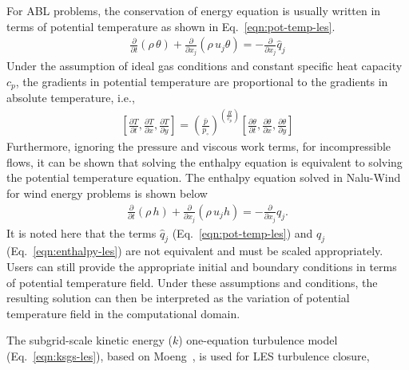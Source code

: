 For ABL problems, the conservation of energy equation is usually written in
terms of potential temperature as shown in Eq.~\ref{eqn:pot-temp-les}.
\begin{align}
  \frac{\partial}{\partial t} \left(\rho\, {\theta}\right) +
  \frac{\partial}{\partial x_j} \left(\rho\, {u}_j {\theta} \right) = - \frac{\partial}{\partial x_j} \hat{q}_j \label{eqn:pot-temp-les}
\end{align}
Under the assumption of ideal gas conditions and constant specific heat capacity
$c_p$, the gradients in potential temperature are proportional to the gradients
in absolute temperature, i.e.,
\begin{align}
   \left[ \frac{\partial T}{\partial t}, \frac{\partial T}{\partial x}, \frac{\partial T}{\partial y} \right] =
   \left( \frac{\bar{p}}{p_\circ} \right)^{\left(\frac{R}{c_p}\right)} \left[ \frac{\partial \theta}{\partial t}, \frac{\partial \theta}{\partial x}, \frac{\partial \theta}{\partial y} \right]
\end{align}
Furthermore, ignoring the pressure and viscous work terms, for incompressible
flows, it can be shown that solving the enthalpy equation is equivalent to
solving the potential temperature equation. The enthalpy equation solved in
Nalu-Wind for wind energy problems is shown below
\begin{align}
  \frac{\partial}{\partial t} \left(\rho\, {h}\right) +
  \frac{\partial}{\partial x_j} \left(\rho\, {u}_j {h} \right) = - \frac{\partial}{\partial x_j} q_j . \label{eqn:enthalpy-les}
\end{align}
It is noted here that the terms $\hat{q}_j$ (Eq.~\ref{eqn:pot-temp-les}) and
$q_j$ (Eq.~\ref{eqn:enthalpy-les}) are not equivalent and must be scaled
appropriately. Users can still provide the appropriate initial and boundary
conditions in terms of potential temperature field. Under these assumptions and
conditions, the resulting solution can then be interpreted as the variation of
potential temperature field in the computational domain.

The subgrid-scale kinetic energy ($k$) one-equation turbulence model
(Eq.~\ref{eqn:ksgs-les}), based on Moeng~\cite{Moeng1984}, is used for
LES turbulence closure,

